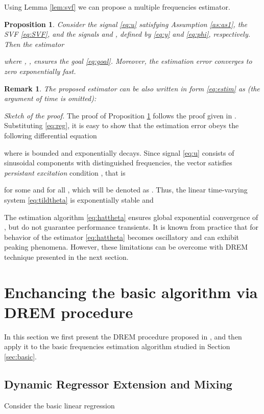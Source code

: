 \documentclass[journal, onecolumn]{IEEEtran}
\newtheorem{remark}{Remark}
\newtheorem{prop}{Proposition}
\begin{document}
Using Lemma \ref{lem:svf} we can propose a multiple frequencies estimator.

\begin{prop} \label{prop:estim}
Consider the signal \eqref{eq:u} satisfying Assumption \ref{as:as1}, the SVF \eqref{eq:SVF}, and the signals  and , defined by \eqref{eq:y} and \eqref{eq:phi}, respectively. Then the estimator

where , , ensures the goal \eqref{eq:goal}. Moreover, the estimation error  converges to zero exponentially fast. \end{prop}

\begin{remark}
	The proposed estimator can be also written in form \eqref{eq:estim} as (the argument of time is omitted):
	
\end{remark}

\emph{Sketch of the proof.} The proof of Proposition \ref{prop:estim} follows the proof given in \cite{pyrkin2015estimation}. Substituting \eqref{eq:reg}, it is easy to show that the estimation error  obeys the following differential equation

where  is bounded and exponentially decays. Since signal \eqref{eq:u} consists of  sinusoidal components with distinguished frequencies, the vector  satisfies \emph{persistant excitation} condition \cite{sastry2011adaptive}, that is 

for some  and for all , which will be denoted as . Thus, the linear time-varying system \eqref{eq:tildtheta} is exponentially stable and 
 

The estimation algorithm \eqref{eq:hattheta} ensures global exponential convergence of , but do not guarantee performance transients. It is known from practice that for  behavior of the estimator \eqref{eq:hattheta} becomes oscillatory and can exhibit peaking phenomena. However, these limitations can be overcome with DREM technique presented in the next section.

\section{Enchancing the basic algorithm via DREM procedure} \label{sec:DREM}
In this section we first present the DREM procedure proposed in \cite{Aranovskiy2015DREM}, and then apply it to the basic frequencies estimation algorithm studied in Section \ref{sec:basic}.

\subsection{Dynamic Regressor Extension and Mixing}
 Consider the basic linear regression 
\end{document}
